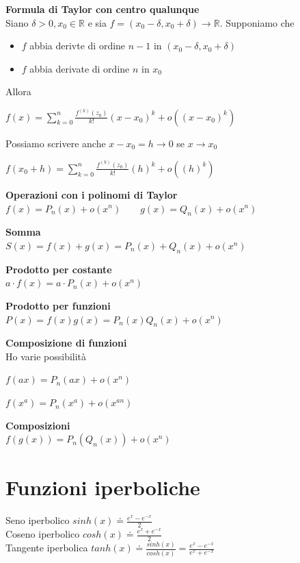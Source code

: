 \documentclass[12pt, a4paper]{article}
\begin{document}
    \textbf{Formula di Taylor con centro qualunque}\\Siano $\delta>0,x_{0}\in\mathbb{R}$ e sia
$f=(x_{0}-\delta,x_{0}+\delta)\to\mathbb{R}$. Supponiamo che
    \begin{itemize}
        \item $f$ abbia derivte di ordine $n-1$ in $(x_{0}-\delta,x_{0}+\delta)$
        \item $f$ abbia derivate di ordine $n$ in $x_{0}$
    \end{itemize}
    Allora
    \begin{center}
        $f(x)=\sum^{n}_{k=0}\frac{f^{(k)}(z_{0})}{k!}(x-x_{0})^{k}+o((x-x_{0})^{k})$
    \end{center}
    Possiamo scrivere anche $x-x_{0}=h\to 0$ se $x\to x_{0}$
    \begin{center}
        $f(x_{0}+h)=\sum^{n}_{k=0}\frac{f^{(k)}(z_{0})}{k!}(h)^{k}+o((h)^{k})$
    \end{center}

    \textbf{Operazioni con i polinomi di Taylor}\\
$f(x)=P_{n}(x)+o(x^{n})\qquad g(x)=Q_{n}(x)+o(x^{n})$

    \textbf{Somma}\\$S(x)=f(x)+g(x)=P_{n}(x)+Q_{n}(x)+o(x^{n})$

\textbf{Prodotto per costante}\\$a\cdot f(x)=a\cdot P_{n}(x)+o(x^{n})$

    \textbf{Prodotto per funzioni}\\$P(x)=f(x)g(x)=P_{n}(x)Q_{n}(x)+o(x^{n})$

\textbf{Composizione di funzioni}\\Ho varie possibilità

$f(ax)=P_{n}(ax)+o(x^{n})$

$f(x^{a})=P_{n}(x^{a})+o(x^{an})$

\textbf{Composizioni}\\$f(g(x))=P_{n}(Q_{n}(x))+o(x^{n})$

    \newpage
    \section{Funzioni iperboliche}

    \begin{center}
        Seno iperbolico $sinh(x)\doteq\frac{e^{x}-e^{-x}}{2}$\\
        Coseno iperbolico $cosh(x)\doteq\frac{e^{x}+e^{-x}}{2}$\\
        Tangente iperbolica $tanh(x)\doteq\frac{sinh(x)}{cosh(x)}=\frac{e^{x}-e^{-x}}{e^{x}+e^{-x}}$\\
    \end{center}
\end{document}
